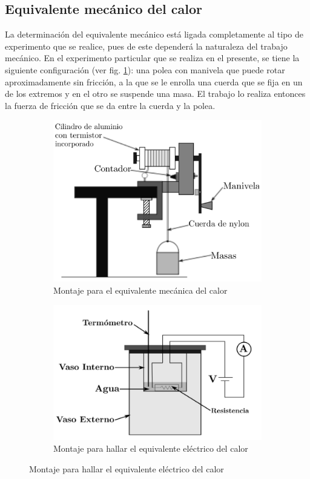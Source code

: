 \subsection{Equivalente mecánico del calor}

La determinación del equivalente mecánico está ligada completamente al tipo de experimento que se realice, pues de este dependerá la naturaleza del trabajo mecánico. En el experimento particular que se realiza en el presente, se tiene la siguiente configuración (ver fig. \ref{fig:montaje_mec}): una polea con manivela que puede rotar aproximadamente sin fricción, a la que se le enrolla una cuerda que se fija en un de los extremos y en el otro se suspende una masa. El trabajo lo realiza entonces la fuerza de fricción que se da entre la cuerda y la polea.


\begin{figure}
    \begin{subfigure}{0.45\textwidth}
        \centering
        \includegraphics[width=0.85\linewidth]{img/montaje_mec.png}
        \caption{Montaje para el equivalente mecánica del calor}
        \label{fig:montaje_mec}
    \end{subfigure}
    \hfill
    \begin{subfigure}{0.45\textwidth}
        \centering
        \includegraphics[width=0.85\linewidth]{img/esquema_elec.png}
        \caption{Montaje para hallar el equivalente eléctrico del calor}
        \label{fig:esquema_elec}
    \end{subfigure}
\end{figure}

